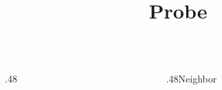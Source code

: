 \documentclass[11pt,aspectratio=169]{beamer}
\title{Probe}
\date{}
\begin{document}
\begin{frame}\begin{columns}[onlytextwidth]\begin{column}{.48\textwidth}\centering {}\end{column}\begin{column}{.48\textwidth}Neighbor\end{column}\end{columns}\end{frame}
\end{document}
